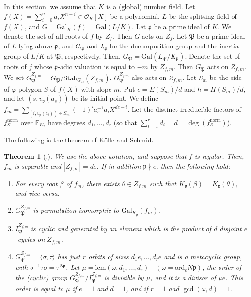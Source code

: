 \documentclass{article}
\newcommand{\field}[1]{\mathbb{#1}}
\newcommand{\F}{\field{F}}
\newcommand{\Gal}{\mathrm{Gal}}
\newtheorem{theorem}{Theorem}[section]
\theoremstyle{definition}
\theoremstyle{remark}
\numberwithin{equation}{section}
\begin{document}
    In this section, we assume that $K$ is a (global) number field. 
    Let $f(X)=\sum_{i = 0}^n a_i X^{n - i} \in \mathcal{O}_K[X]$ be a polynomial, $L$ be the splitting field of $f(X)$, and $G = \Gal_K(f) = \Gal(L/K)$. 
    Let $\mathfrak{p}$ be a prime ideal of $K$. 
    We denote the set of all roots of $f$ by $Z_f$. Then $G$ acts on $Z_f$. 
    Let $\mathfrak{P}$ be a prime ideal of $L$ lying above $\mathfrak{p}$, and $G_\mathfrak{P}$ and $I_\mathfrak{P}$ be the 
    decomposition group and the inertia group of $L/K$ at $\mathfrak{P}$, respectively. 
    Then, $G_{\mathfrak{P}} = \Gal(L_{\mathfrak{P}}/K_{\mathfrak{p}})$. 
    Denote the set of roots of $f$ whose $\mathfrak{p}$-adic valuation is equal to $-m$ by $Z_{f,m}$. 
    Then $G_{\mathfrak{P}}$ acts on $Z_{f,m}$. 
    We set $G_{\mathfrak{P}}^{Z_{f,m}} = G_{\mathfrak{P}}/\mathrm{Stab}_{G_{\mathfrak{P}}}(Z_{f,m})$. 
    $G_{\mathfrak{P}}^{Z_{f,m}}$ also acts on $Z_{f,m}$. 
    Let $S_m$ be the side of $\varphi$-polygon $S$ of $f(X)$ with slope $m$. 
    Put $e=E(S_m)/d$ and $h=H(S_m)/d$, and let $(s,v_{\mathfrak{p}}(a_s))$ be its initial point. 
    We define $f_m =  \displaystyle{\sum_{(i,v_{\mathfrak{p}}(a_i)) \in S_m}}  (-1)^i a_s^{-1} a_{i}X^{de-i}$. 
    Let the distinct irreducible factors of $f_S^{\mathrm{norm}}$ over $\F_{K_{\mathfrak{p}}}$ have 
    degrees $d_1, \dots ,d_r$ (so that $\sum_{i = 1}^r d_i = d = \deg (f_S^{\mathrm{norm}})$). 
    
    The following is the theorem of Kölle and Schmid. 

    \begin{theorem}[{\cite[Theorem]{MR2102807},\cite{MR2557856}}]\label{thm:theorem of Kölle Schmid}
      We use the above notation, and suppose that $f$ is regular. 
      Then, $f_m$ is separable and $|Z_{f,m}| = de$. 
      If in addition $\mathfrak{p} \nmid e$, then the following hold:
      \begin{enumerate}
        \item For every root $\beta$ of $f_m$, there exists $\theta \in Z_{f,m}$ such that $K_{\mathfrak{p}}(\beta) = K_{\mathfrak{p}}(\theta)$, and vice versa. 
        \item $G_{\mathfrak{P}}^{Z_{f,m}}$ is permutation isomorphic to $\Gal_{K_\mathfrak{p}}(f_m)$. 
        \item $I_{\mathfrak{P}}^{Z_{f,m}}$ is cyclic and generated by an element which is the product of $d$ disjoint $e$-cycles on $Z_{f,m}$. 
        \item $G_{\mathfrak{P}}^{Z_{f,m}} = \langle \sigma,\tau \rangle$ has just $r$ orbits of sizes $d_1 e, \dots ,d_r e$ 
          and is a metacyclic group, with $\sigma^{-1}\tau\sigma = \tau^{N\mathfrak{p}}$. 
          Let $\mu = \mathrm{lcm}(\omega,d_1, \dots ,d_r) \quad (\omega = \mathrm{ord}_e N\mathfrak{p})$, the order of the (cyclic) group $G_{\mathfrak{P}}^{Z_{f,m}}/I_{\mathfrak{P}}^{Z_{f,m}}$ 
          is divisible by $\mu$, and it is a divisor of $\mu e$. 
          This order is equal to $\mu$ if $e = 1$ and $d = 1$, and if $r = 1$ and $\gcd (\omega,d) = 1$. 
      \end{enumerate}
    \end{theorem}
\end{document}
